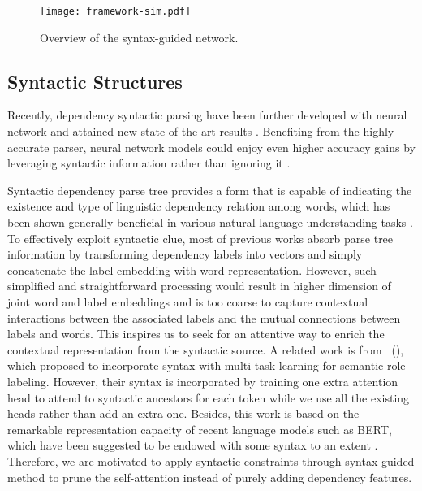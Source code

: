 \documentclass[letterpaper]{article} \usepackage{color}
\begin{document}
\begin{figure*}
	\centering
	\texttt{[image: framework-sim.pdf]}
	\caption{\label{fig:overview} Overview of the syntax-guided network.}
\end{figure*}
\subsection{Syntactic Structures}

Recently, dependency syntactic parsing have been further developed with neural network and attained new state-of-the-art results \cite{zhang-etal-2016-probabilistic,li-etal-2018-seq2seq,Ma2018Stack,li2020global}.
Benefiting from the highly accurate parser, neural network models could enjoy even higher accuracy gains by leveraging syntactic information rather than ignoring it \cite{chen2017neural2,chen2017neural,chen2018syntax,duan2019ialp}. 

Syntactic dependency parse tree provides a form that is capable of indicating the existence and type of linguistic dependency relation among words, which has been shown generally beneficial in various natural language understanding tasks \cite{bowman2016fast}. To effectively exploit syntactic clue, most of previous works \cite{kasai2019syntax} absorb parse tree information by transforming dependency labels into vectors and simply concatenate the label embedding with word representation. However, such simplified and straightforward processing would result in higher dimension of joint word and label embeddings and is too coarse to capture contextual interactions between the associated labels and the mutual connections between labels and words. This inspires us to seek for an attentive way to enrich the contextual representation from the syntactic source. A related work is from \citeauthor{strubell2018linguistically}~(\citeyear{strubell2018linguistically}), which proposed to incorporate syntax with multi-task learning for semantic role labeling. However, their syntax is incorporated by training one extra attention head to attend to syntactic ancestors for each token while we use all the existing heads rather than add an extra one. Besides, this work is based on the remarkable representation capacity of recent language models such as BERT, which have been suggested to be endowed with some syntax to an extent \cite{clark2019does}. Therefore, we are motivated to apply syntactic constraints through syntax guided method to prune the self-attention instead of purely adding dependency features.
\end{document}
